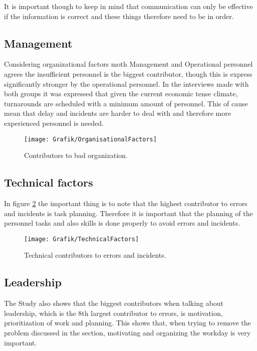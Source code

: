 It is important though to keep in mind that communication can only be effective if the information is correct and these things therefore need to be in order.

\newpage
\subsection{Management} %
Considering organizational factors moth Management and Operational personnel agrees the insufficient personnel is the biggest contributor, though this is express significantly stronger by the operational personnel. In the interviews made with both groups it was expressed that given the current economic tense climate, turnarounds are scheduled with a minimum amount of personnel. This of cause mean that delay and incidents are harder to deal with and therefore more experienced personnel is needed.

\begin{figure}[H]
\centering
\texttt{[image: Grafik/OrganisationalFactors]}
\caption{Contributors to bad organization.}
\label{OrganisationalFactors}
\end{figure}

\newpage
\subsection{Technical factors}
In figure \ref{TechnicalFactors} the important thing is to note that the highest contributor to errors and incidents is task planning. Therefore it is important that the planning of the personnel tasks and also skills is done properly to avoid errors and incidents.

\begin{figure}[H]
\centering
\texttt{[image: Grafik/TechnicalFactors]}
\caption{Technical contributors to errors and incidents.}
\label{TechnicalFactors}
\end{figure}

\subsection{Leadership}
The Study also shows that the biggest contributors when talking about leadership, which is the 8th largest contributor to errors, is motivation, prioritization of work and planning. This shows that, when trying to remove the problem discussed in the section, motivating and organizing the workday is very important.